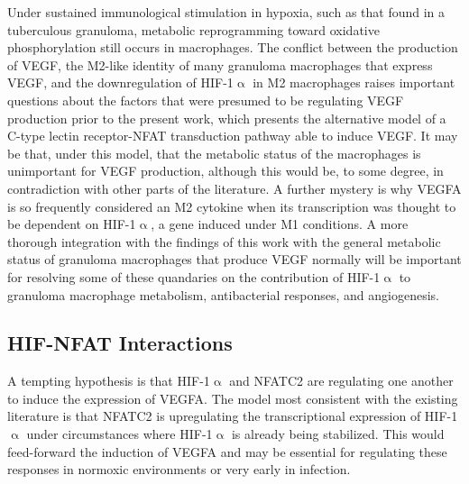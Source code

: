Under sustained immunological stimulation in hypoxia, such as that found in a tuberculous granuloma, metabolic reprogramming toward oxidative phosphorylation still occurs in macrophages. The conflict between the production of VEGF, the M2-like identity of many granuloma macrophages that express VEGF, and the downregulation of HIF-1$\upalpha$ in M2 macrophages raises important questions about the factors that were presumed to be regulating VEGF production prior to the present work, which presents the alternative model of a C-type lectin receptor-NFAT transduction pathway able to induce VEGF. It may be that, under this model, that the metabolic status of the macrophages is unimportant for VEGF production, although this would be, to some degree, in contradiction with other parts of the literature. A further mystery is why VEGFA is so frequently considered an M2 cytokine when its transcription was thought to be dependent on HIF-1$\upalpha$, a gene induced under M1 conditions. A more thorough integration with the findings of this work with the general metabolic status of granuloma macrophages that produce VEGF normally will be important for resolving some of these quandaries on the contribution of HIF-1$\upalpha$ to granuloma macrophage metabolism, antibacterial responses, and angiogenesis.

\subsection{HIF-NFAT Interactions}

A tempting hypothesis is that HIF-1$\upalpha$ and NFATC2 are regulating one another to induce the expression of VEGFA. The model most consistent with the existing literature is that NFATC2 is upregulating the transcriptional expression of HIF-1$\upalpha$ under circumstances where HIF-1$\upalpha$ is already being stabilized. This would feed-forward the induction of VEGFA and may be essential for regulating these responses in normoxic environments or very early in infection. 

